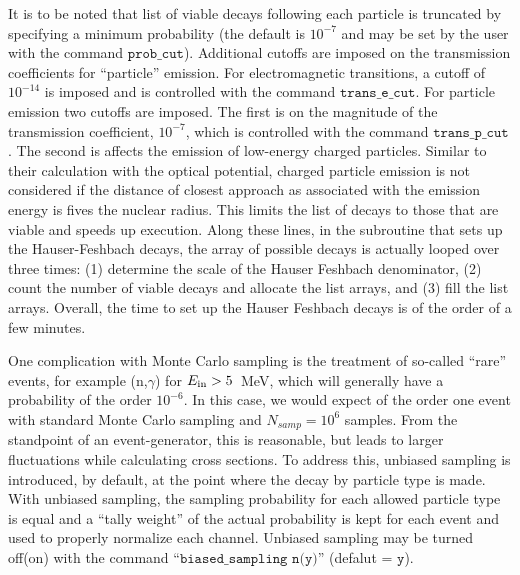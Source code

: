 \documentclass[
10pt,
showpacs,preprintnumbers,footinbib,
amsfonts,amsmath,amssymb,
aps,
prc,twocolumn,groupedaddress,superscriptaddress,
showkeys,
nofootinbib
]{revtex4-1}
\begin{document}
It is to be noted that list of viable decays following each particle is truncated by specifying a minimum probability (the default is $10^{-7}$ and may be set by the user with the command ${\texttt{prob\_cut}}$). Additional cutoffs are imposed on the transmission coefficients for ``particle'' emission. For electromagnetic transitions, a cutoff of $10^{-14}$ is imposed and is controlled with the command ${\texttt{trans\_e\_cut}}$. For particle emission two cutoffs are imposed. The first is on the magnitude of the transmission coefficient, $10^{-7}$, which is controlled with the command ${\texttt{trans\_p\_cut}}$. The second is affects the emission of low-energy charged particles. Similar to their calculation with the optical potential, charged particle emission is not considered if the distance of closest approach as associated with the emission energy is fives the nuclear radius. This limits the list of decays to those that are viable and speeds up execution. Along these lines, in the subroutine that sets up the Hauser-Feshbach decays, the array of possible decays is actually looped over three times: (1) determine the scale of the Hauser Feshbach denominator, (2) count the number of viable decays and allocate the list arrays, and (3) fill the list arrays. Overall, the time to set up the Hauser Feshbach decays is of the order of a few minutes.

One complication with Monte Carlo sampling is the treatment of so-called ``rare'' events, for example (n,$\gamma$) for $E_{\rm in} > 5$~MeV, which will generally have a probability of the order $10^{-6}$. In this case, we would expect of the order one event with standard Monte Carlo sampling and $N_{samp}=10^6$ samples. From the standpoint of an event-generator, this is reasonable, but leads to larger fluctuations while calculating cross sections. To address this, unbiased sampling is introduced, by default, at the point where the decay by particle type is made. With unbiased sampling, the sampling probability for each allowed particle type is equal and a ``tally weight'' of the actual probability is kept for each event and used to properly normalize each channel. Unbiased sampling may be turned off(on) with the command ``${\texttt{biased\_sampling n(y)}}$'' (defalut = ${\texttt{y}}$).
\end{document}
